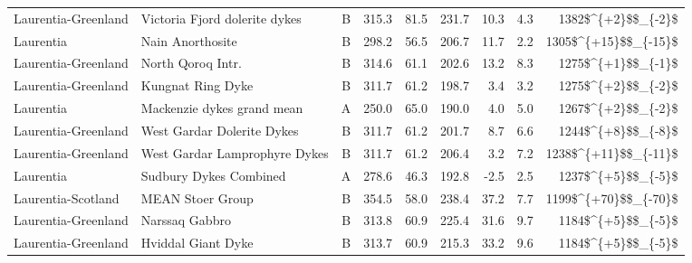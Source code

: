 \begin{longtable}{p{1 in}p{1 in}rrrrrrr}
           Laurentia-Greenland &                      Victoria Fjord dolerite dykes &      B &     315.3 &      81.5 & 231.7 &  10.3 &       4.3 &     1382\$\textasciicircum \{+2\}\$\$\_\{-2\}\$ \\
                     Laurentia &                                   Nain Anorthosite &      B &     298.2 &      56.5 & 206.7 &  11.7 &       2.2 &   1305\$\textasciicircum \{+15\}\$\$\_\{-15\}\$ \\
           Laurentia-Greenland &                                  North Qoroq Intr. &      B &     314.6 &      61.1 & 202.6 &  13.2 &       8.3 &     1275\$\textasciicircum \{+1\}\$\$\_\{-1\}\$ \\
           Laurentia-Greenland &                                  Kungnat Ring Dyke &      B &     311.7 &      61.2 & 198.7 &   3.4 &       3.2 &     1275\$\textasciicircum \{+2\}\$\$\_\{-2\}\$ \\
                     Laurentia &                         Mackenzie dykes grand mean &      A &     250.0 &      65.0 & 190.0 &   4.0 &       5.0 &     1267\$\textasciicircum \{+2\}\$\$\_\{-2\}\$ \\
           Laurentia-Greenland &                         West Gardar Dolerite Dykes &      B &     311.7 &      61.2 & 201.7 &   8.7 &       6.6 &     1244\$\textasciicircum \{+8\}\$\$\_\{-8\}\$ \\
           Laurentia-Greenland &                      West Gardar Lamprophyre Dykes &      B &     311.7 &      61.2 & 206.4 &   3.2 &       7.2 &   1238\$\textasciicircum \{+11\}\$\$\_\{-11\}\$ \\
                     Laurentia &                             Sudbury Dykes Combined &      A &     278.6 &      46.3 & 192.8 &  -2.5 &       2.5 &     1237\$\textasciicircum \{+5\}\$\$\_\{-5\}\$ \\
            Laurentia-Scotland &                                   MEAN Stoer Group &      B &     354.5 &      58.0 & 238.4 &  37.2 &       7.7 &   1199\$\textasciicircum \{+70\}\$\$\_\{-70\}\$ \\
           Laurentia-Greenland &                                     Narssaq Gabbro &      B &     313.8 &      60.9 & 225.4 &  31.6 &       9.7 &     1184\$\textasciicircum \{+5\}\$\$\_\{-5\}\$ \\
           Laurentia-Greenland &                                 Hviddal Giant Dyke &      B &     313.7 &      60.9 & 215.3 &  33.2 &       9.6 &     1184\$\textasciicircum \{+5\}\$\$\_\{-5\}\$ \\

\end{longtable}
